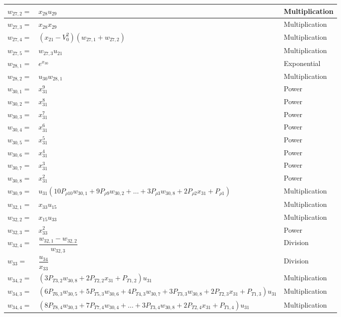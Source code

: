 \begin{longtable}{|p{1.5cm}|l|p{2cm}|}
$w_{27,2}=$ & $ x_{28}u_{29} $ & Multiplication \\ \hline
$w_{27,3}=$ & $ x_{28}x_{29} $ & Multiplication \\ \hline
$w_{27,4}=$ & $ \left(x_{21}-V_{0}^{2}\right)\left(w_{27,1}+w_{27,2}\right) $ & Multiplication \\ \hline
$w_{27,5}=$ & $ w_{27,3}u_{21} $ & Multiplication \\ \hline
$w_{28,1}=$ & $ e^{x_{30}} $ & Exponential \\ \hline
$w_{28,2}=$ & $ u_{30}w_{28,1} $ & Multiplication \\ \hline
$w_{30,1}=$ & $ x_{31}^{9} $ & Power \\ \hline
$w_{30,2}=$ & $ x_{31}^{8} $ & Power \\ \hline
$w_{30,3}=$ & $ x_{31}^{7} $ & Power \\ \hline
$w_{30,4}=$ & $ x_{31}^{6} $ & Power \\ \hline
$w_{30,5}=$ & $ x_{31}^{5} $ & Power \\ \hline
$w_{30,6}=$ & $ x_{31}^{4} $ & Power \\ \hline
$w_{30,7}=$ & $ x_{31}^{3} $ & Power \\ \hline
$w_{30,8}=$ & $ x_{31}^{2} $ & Power \\ \hline
$w_{30,9}=$ & $ u_{31}\left(10 P_{\rho 10}w_{30,1}+9 P_{\rho 9}w_{30,2}+\dots+3 P_{\rho 3}w_{30,8}+2 P_{\rho 2}x_{31}+P_{\rho 1}\right) $ & Multiplication \\ \hline
$w_{32,1}=$ & $ x_{33}u_{15} $ & Multiplication \\ \hline
$w_{32,2}=$ & $ x_{15}u_{33} $ & Multiplication \\ \hline
$w_{32,3}=$ & $ x_{33}^{2} $ & Power \\ \hline
$w_{32,4}=$ & $ \dfrac{w_{32,1}-w_{32,2}}{w_{32,3}} $ & Division \\ \hline
$w_{33}=$ & $ \dfrac{u_{34}}{x_{33}} $ & Division \\ \hline
$w_{34,2}=$ & $ \left(3P_{T 3,2}w_{30,8}+2P_{T 2,2}x_{31}+P_{T 1,2}\right)u_{31} $ & Multiplication \\ \hline
$w_{34,3}=$ & $ \left(6 P_{T 6,3}w_{30,5}+5P_{T 5,3}w_{30,6}+4P_{T 4,3}w_{30,7}+3P_{T 3,3}w_{30,8}+2P_{T 2,3}x_{31}+P_{T 1,3}\right)u_{31} $ & Multiplication \\ \hline
$w_{34,4}=$ & $ \left(8 P_{T 8,4}w_{30,3}+7P_{T 7,4}w_{30,4}+\dots+3P_{T 3,4}w_{30,8}+2P_{T 2,4}x_{31}+P_{T 1,4}\right)u_{31} $ & Multiplication \\ \hline


			
\end{longtable}

